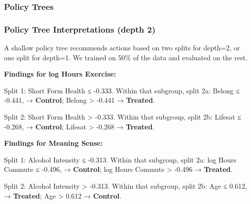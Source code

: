 \documentclass[
  single column]{article}
\begin{document}
\newpage{}

\subsubsection{Policy Trees}\label{policy-trees}

\subsubsection{Policy Tree Interpretations (depth
2)}\label{policy-tree-interpretations-depth-2}

A shallow policy tree recommends actions based on two splits for
depth=2, or one split for depth=1. We trained on 50\% of the data and
evaluated on the rest.

\textbf{Findings for log Hours Exercise:}

Split 1: Short Form Health ≤ -0.333. Within that subgroup, split 2a:
Belong ≤ -0.441, → \textbf{Control}; Belong \textgreater{} -0.441 →
\textbf{Treated}.

Split 2: Short Form Health \textgreater{} -0.333. Within that subgroup,
split 2b: Lifesat ≤ -0.268, → \textbf{Control}; Lifesat \textgreater{}
-0.268 → \textbf{Treated}.

\textbf{Findings for Meaning Sense:}

Split 1: Alcohol Intensity ≤ -0.313. Within that subgroup, split 2a: log
Hours Commute ≤ -0.496, → \textbf{Control}; log Hours Commute
\textgreater{} -0.496 → \textbf{Treated}.

Split 2: Alcohol Intensity \textgreater{} -0.313. Within that subgroup,
split 2b: Age ≤ 0.612, → \textbf{Treated}; Age \textgreater{} 0.612 →
\textbf{Control}.
\end{document}
